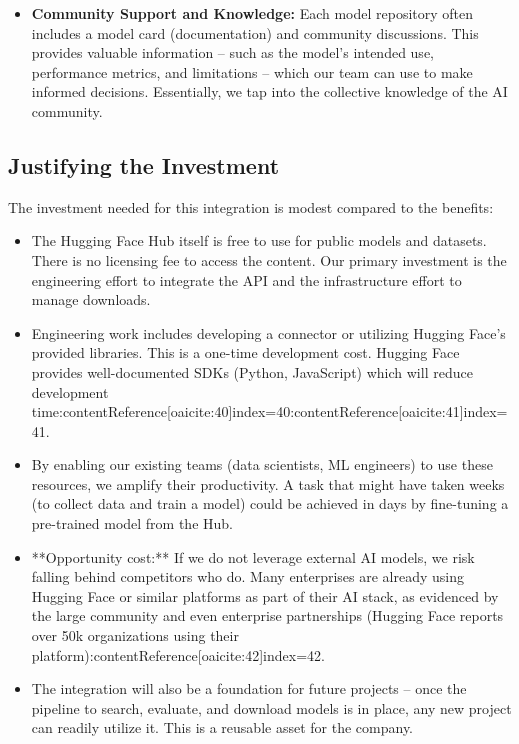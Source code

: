 \documentclass{article}
\begin{document}
\begin{itemize}
    \item \textbf{Community Support and Knowledge:} Each model repository often includes a model card (documentation) and community discussions. This provides valuable information – such as the model’s intended use, performance metrics, and limitations – which our team can use to make informed decisions. Essentially, we tap into the collective knowledge of the AI community. 
\end{itemize}

\subsection*{Justifying the Investment}
The investment needed for this integration is modest compared to the benefits:
\begin{itemize}
    \item The Hugging Face Hub itself is free to use for public models and datasets. There is no licensing fee to access the content. Our primary investment is the engineering effort to integrate the API and the infrastructure effort to manage downloads.
    \item Engineering work includes developing a connector or utilizing Hugging Face’s provided libraries. This is a one-time development cost. Hugging Face provides well-documented SDKs (Python, JavaScript) which will reduce development time:contentReference[oaicite:40]{index=40}:contentReference[oaicite:41]{index=41}.
    \item By enabling our existing teams (data scientists, ML engineers) to use these resources, we amplify their productivity. A task that might have taken weeks (to collect data and train a model) could be achieved in days by fine-tuning a pre-trained model from the Hub.
    \item **Opportunity cost:** If we do not leverage external AI models, we risk falling behind competitors who do. Many enterprises are already using Hugging Face or similar platforms as part of their AI stack, as evidenced by the large community and even enterprise partnerships (Hugging Face reports over 50k organizations using their platform):contentReference[oaicite:42]{index=42}.
    \item The integration will also be a foundation for future projects – once the pipeline to search, evaluate, and download models is in place, any new project can readily utilize it. This is a reusable asset for the company.
\end{itemize}
\end{document}
